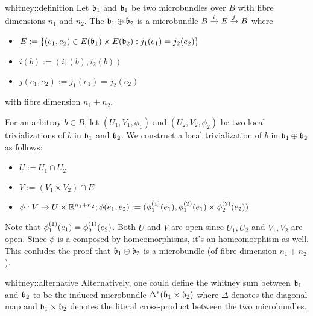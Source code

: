 \begin{mydefinition}{whitney::definition}{}
    Let $\bb_1$ and $\bb_1$ be two microbundles over $B$ with fibre dimensions $n_1$ and $n_2$.
    The  $\whitney{\bb_1}{\bb_2}$ is a microbundle $\bundle{B}{E}{i}{j}$ where
    \begin{itemize}
        \item $E := \set{ (e_1, e_2) \in E(\bb_1) \times E(\bb_2)}{j_1(e_1) = j_2(e_2)}$
        \item $i(b) := (i_1(b), i_2(b))$
        \item $j(e_1, e_2) := j_1(e_1) = j_2(e_2)$
    \end{itemize}
    with fibre dimension $n_1 + n_2$.
\end{mydefinition}

\begin{myproof}
    For an arbitray $b \in B$, let $(U_1, V_1, \phi_1)$ and $(U_2, V_2, \phi_2)$
    be two local trivializations of $b$ in $\bb_1$ and $\bb_2$.
    We construct a local trivialization of $b$ in $\whitney{\bb_1}{\bb_2}$ as follows:
    \begin{itemize}
        \item $U := U_1 \cap U_2$
        \item $V := (V_1 \times V_2) \cap E$
        \item $\phi: V \to U \times \R^{n_1 + n_2}; \phi(e_1, e_2) := (\frst{\phi_1}(e_1), \snd{\phi_1}(e_1) \times  \snd{\phi_2}(e_2))$
    \end{itemize}
    Note that $\frst{\phi_1}(e_1) = \frst{\phi_2}(e_2)$.
    Both $U$ and $V$ are open since $U_1, U_2$ and $V_1, V_2$ are open.
    Since $\phi$ is a composed by homeomorphisms, it's an homeomorphism as well.
    This conludes the proof that $\whitney{\bb_1}{\bb_2}$ is a microbundle (of fibre dimension $n_1 + n_2$).
\end{myproof}

\begin{myremark}{whitney::alternative}{}
    Alternatively, one could define the whitney sum between $\bb_1$ and $\bb_2$
    to be the induced microbundle $\ind{\Delta}(\bb_1 \times \bb_2)$
    where $\Delta$ denotes the diagonal map and $\bb_1 \times \bb_2$
    denotes the literal cross-product between the two microbundles.
\end{myremark}